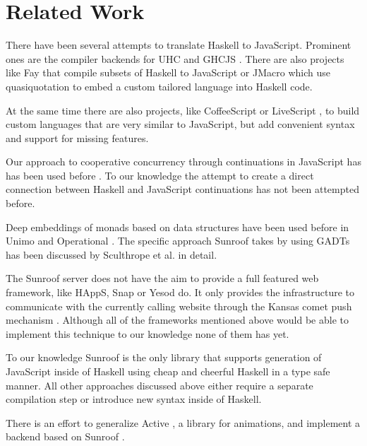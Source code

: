  
\section{Related Work}

There have been several attempts to translate Haskell to JavaScript.
Prominent ones are the compiler backends for 
UHC \cite{Stutterheim:12:ImprovingUHCJavaScriptBackend} and 
GHCJS \cite{project:ghcjs}. There are also projects like Fay \cite{project:fay} 
that compile subsets of Haskell to JavaScript or JMacro \cite{project:jmacro}
which use quasiquotation \cite{Mainland:07:QuasiquotingHaskell} to embed 
a custom tailored language into Haskell code.

At the same time there are also projects, like 
CoffeeScript \cite{project:coffeescript} or LiveScript \cite{project:livescript},
to build custom languages 
that are very similar to JavaScript, but add convenient syntax and
support for missing features.

Our approach to cooperative concurrency through continuations in JavaScript has
has been used before 
\cite{Cooper:07:LinksWebProgrammingTiers,Predescu:02:CocoonContinuationBasedControlFlow}.
To our knowledge the attempt to create a direct connection
between Haskell and JavaScript continuations has not been 
attempted before.

Deep embeddings of monads based on data structures have been used before
in Unimo \cite{Lin:06:Unimo} and Operational \cite{Apfelmus:10:Operational,Hackage:10:Operational}. 
The specific approach Sunroof takes 
by using GADTs has been discussed by 
Sculthrope et al. \cite{Sculthorpe:13:ConstrainedMonads} 
in detail.

The Sunroof server does not have the aim to provide a full featured 
web framework, like HAppS, Snap or Yesod do. It only provides 
the infrastructure to communicate with the currently calling website
through the Kansas comet \cite{project:kansas-comet} 
push mechanism \cite{pattern:push}. Although all of the
frameworks mentioned above would be able to implement this technique
to our knowledge none of them has yet.

To our knowledge Sunroof is the only library that supports 
generation of JavaScript inside of Haskell using cheap and cheerful Haskell
in a type safe manner. All other approaches discussed above
either require a separate compilation step or introduce new 
syntax inside of Haskell.

There is an effort to generalize Active \cite{project:active}, a library for animations, and
implement a backend based on Sunroof \cite{project:sunroof-active}.



